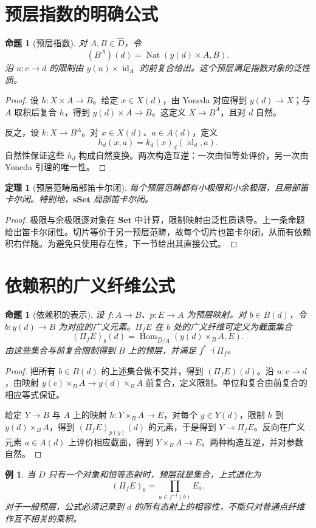 \documentclass[12pt,oneside,openany,fontset=none]{ctexbook}
\theoremstyle{cn}
\newtheorem{example}[definition]{例}
\newtheorem{proposition}[definition]{命题}
\newtheorem{theorem}[definition]{定理}
\numberwithin{equation}{chapter}
\newcommand{\Set}{\mathbf{Set}}
\newcommand{\sSet}{\mathbf{sSet}}
\newcommand{\id}{\operatorname{id}}
\newcommand{\Hom}{\operatorname{Hom}}
\newcommand{\Nat}{\operatorname{Nat}}
\begin{document}
\section{预层指数的明确公式}
\begin{proposition}[预层指数]
对 $A,B\in\widehat D$，令
\[
(B^A)(d)=\Nat(y(d)\times A,B).
\]
沿 $u:c\to d$ 的限制由 $y(u)\times\id_A$ 的前复合给出。这个预层满足指数对象的泛性质。
\end{proposition}
\begin{proof}
设 $h:X\times A\to B$。给定 $x\in X(d)$，由 Yoneda 对应得到 $y(d)\to X$；与 $A$ 取积后复合 $h$，得到 $y(d)\times A\to B$。这定义 $X\to B^A$，且对 $d$ 自然。

反之，设 $k:X\to B^A$。对 $x\in X(d)$、$a\in A(d)$，定义
\[
h_d(x,a)=k_d(x)_d(\id_d,a).
\]
自然性保证这些 $h_d$ 构成自然变换。两次构造互逆：一次由恒等处评价，另一次由 Yoneda 引理的唯一性。
\end{proof}
\begin{theorem}[预层范畴局部笛卡尔闭]
每个预层范畴都有小极限和小余极限，且局部笛卡尔闭。特别地，$\sSet$ 局部笛卡尔闭。
\end{theorem}
\begin{proof}
极限与余极限逐对象在 $\Set$ 中计算，限制映射由泛性质诱导。上一条命题给出笛卡尔闭性。切片等价于另一预层范畴，故每个切片也笛卡尔闭，从而有依赖积右伴随。为避免只使用存在性，下一节给出其直接公式。
\end{proof}

\section{依赖积的广义纤维公式}
\begin{proposition}[依赖积的表示]
设 $f:A\to B$、$p:E\to A$ 为预层映射。对 $b\in B(d)$，令 $b:y(d)\to B$ 为对应的广义元素。$\Pi_fE$ 在 $b$ 处的广义纤维可定义为截面集合
\[
(\Pi_fE)_b(d)=
\Hom_{\widehat D/A}(y(d)\times_BA,E).
\]
由这些集合与前复合限制得到 $B$ 上的预层，并满足 $f^*\dashv\Pi_f$。
\end{proposition}
\begin{proof}
把所有 $b\in B(d)$ 的上述集合做不交并，得到 $(\Pi_fE)(d)$。沿 $u:c\to d$，由映射 $y(c)\times_BA\to y(d)\times_BA$ 前复合，定义限制。单位和复合由前复合的相应等式保证。

给定 $Y\to B$ 与 $A$ 上的映射 $h:Y\times_BA\to E$，对每个 $y\in Y(d)$，限制 $h$ 到 $y(d)\times_BA$，得到 $(\Pi_fE)_{p(y)}(d)$ 的元素，于是得到 $Y\to\Pi_fE$。反向在广义元素 $a\in A(d)$ 上评价相应截面，得到 $Y\times_BA\to E$。两种构造互逆，并对参数自然。
\end{proof}
\begin{example}
当 $D$ 只有一个对象和恒等态射时，预层就是集合，上式退化为
\[
(\Pi_fE)_b=\prod_{a\in f^{-1}(b)}E_a.
\]
对于一般预层，公式必须记录到 $d$ 的所有态射上的相容性，不能只对普通点纤维作互不相关的乘积。
\end{example}
\end{document}
